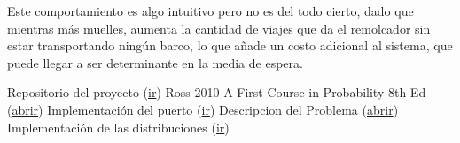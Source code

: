 	Este comportamiento es algo intuitivo pero no es del todo cierto, dado que mientras
	m\'as muelles, aumenta la cantidad de viajes que da el remolcador sin estar 
	transportando ning\'un barco, lo que a\~nade un costo adicional al sistema, que puede
	llegar a ser determinante en la media de espera.



\begin{thebibliography}{99}
	 Repositorio del proyecto (\href{https://github.com/stdevRulo/Overloaded-Harbor/}{ir})
	 Ross 2010 A First Course in Probability 8th Ed (\href{files/ross.pdf}{abrir})
	 Implementaci\'on del puerto (\href{https://github.com/stdevRulo/Overloaded-Harbor/blob/master/harbor.py}{ir})
	 Descripcion del Problema (\href{files/project.pdf}{abrir})
	 Implementaci\'on de las distribuciones (\href{https://github.com/stdevRulo/Overloaded-Harbor/blob/master/utils.py}{ir})
\end{thebibliography}
